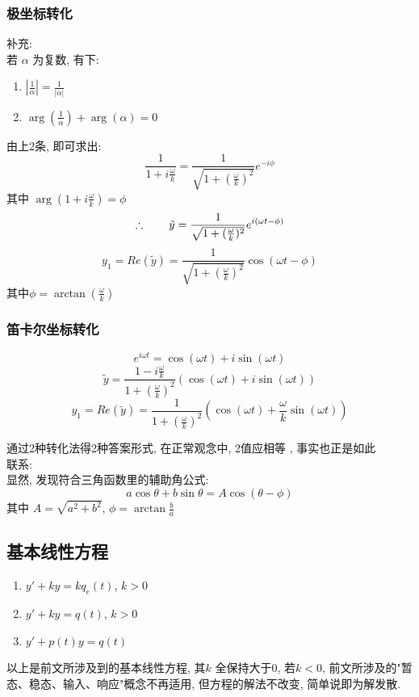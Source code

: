 \subsubsection{\large 极坐标转化}
补充:\\
若 $\alpha $ 为复数, 有下:
\begin{enumerate}
    \item  $\left\lvert \frac{1} {\alpha} \right\rvert  = \frac{1}{\left\lvert \alpha \right\rvert } $  
    \item  $\arg(\frac{1} {\alpha}) + \arg (\alpha ) = 0 $
\end{enumerate}

由上2条, 即可求出:
\[ \frac{1}{1 + i \frac{\omega }{k}} = \frac{1}{\sqrt{1 + (\frac{\omega }{k})^2} } e^{- i \phi } \]
其中 $\arg (1 + i \frac{\omega }{k}) = \phi $
\[ \therefore \hspace*{2em} \tilde{y} = \frac{1}{\sqrt{1 + (\frac{\omega}{k})^2}} e^{i(\omega t - \phi)} \]
\[ y_1 = Re(\tilde{y}) = \frac{1}{\sqrt{1 + (\frac{\omega}{k})^2}} \cos(\omega t - \phi) \]
其中$\phi = \arctan (\frac{\omega }{k })$


\subsubsection{\large 笛卡尔坐标转化}
\[ e^{i\omega t} = \cos(\omega t) + i \sin(\omega t) \]
\[ \tilde{y} = \frac{1 - i \frac{\omega }{k}}{1 + (\frac{\omega }{k})^2} (\cos(\omega t) + i \sin(\omega t)) \]
\[ y_1 = Re(\tilde{y}) = \frac{1}{1 + (\frac{\omega }{k})^2} (\cos(\omega t) + \frac{\omega }{k} \sin(\omega t))\]

通过2种转化法得2种答案形式, 在正常观念中, 2值应相等
, 事实也正是如此\\
联系:\\
显然, 发现符合三角函数里的辅助角公式:
\[ a \cos\theta  + b \sin\theta = A \cos(\theta - \phi ) \]
其中 $A = \sqrt{a^2 + b^2}$, $\phi = \arctan\frac{b}{a}$
\subsection{\large 基本线性方程}
\begin{enumerate}
    \item $y' + k y = k q_e(t)$, $k > 0$
    \item $y' + k y = q(t)$, $k > 0$
    \item $y' + p(t) y = q(t)$
\end{enumerate}
以上是前文所涉及到的基本线性方程, 其$k$ 全保持大于$0$, 
若$k < 0$, 前文所涉及的"暂态、稳态、输入、响应"概念不再适用, 
但方程的解法不改变, 简单说即为解发散.
